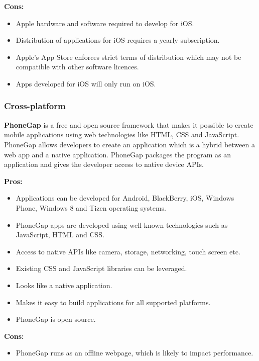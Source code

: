 \indent
  {\bf Cons:}
  \begin{itemize}
    \item Apple hardware and software required to develop for iOS.
    \item Distribution of applications for iOS requires a yearly subscription.
    \item Apple's App Store enforces strict terms of distribution which may not
          be compatible with other software licences.
    \item Apps developed for iOS will only run on iOS.
  \end{itemize}


\subsubsection{Cross-platform}
{\bf PhoneGap} is a free and open source framework that makes it possible
to create mobile applications using web technologies like HTML, CSS and
JavaScript. PhoneGap allows developers to create an application which is a
hybrid between a web app and a native application. PhoneGap packages the
program as an application and gives the developer access to native device APIs.


\indent
  {\bf Pros:}
  \begin{itemize}
    \item Applications can be developed for Android, BlackBerry, iOS,
          Windows Phone, Windows 8 and Tizen operating systems.
    \item PhoneGap apps are developed using well known technologies such as
          JavaScript, HTML and CSS.
    \item Access to native APIs like camera, storage, networking,
          touch screen etc.
    \item Existing CSS and JavaScript libraries can be leveraged.
    \item Looks like a native application.
    \item Makes it easy to build applications for all supported platforms.
    \item PhoneGap is open source.
  \end{itemize}

\indent
{\bf Cons:}
  \begin{itemize}
    \item PhoneGap runs as an offline webpage, which is likely to impact
          performance.
  \end{itemize}

